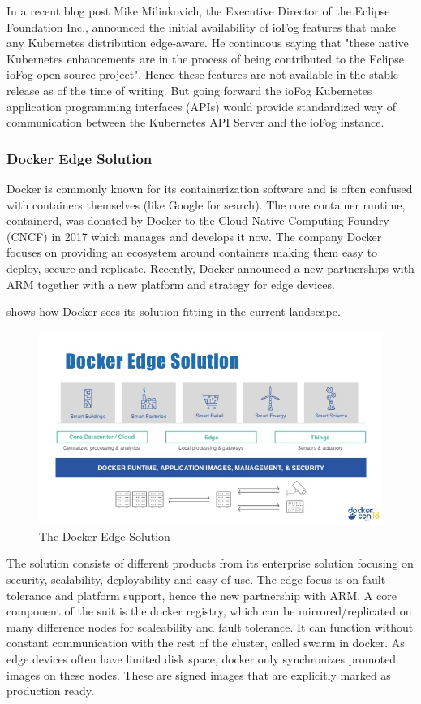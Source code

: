 In a recent blog post Mike Milinkovich, the Executive Director of the Eclipse Foundation Inc., announced the initial availability of ioFog features that make any Kubernetes distribution edge-aware. He continuous saying that "these native Kubernetes enhancements are in the process of being contributed to the Eclipse ioFog open source project". Hence these features are not available in the stable release as of the time of writing. But going forward the ioFog Kubernetes application programming interfaces (APIs) would provide standardized way of communication between the Kubernetes API Server and the ioFog instance.

\subsubsection{Docker Edge Solution}
Docker is commonly known for its containerization software and is often confused with containers themselves (like Google for search). The core container runtime, containerd, was donated by Docker to the Cloud Native Computing Foundry (CNCF) in 2017\cite{containerDonationDocker79:online} which manages and develops it now. The company Docker focuses on providing an ecosystem around containers making them easy to deploy, secure and replicate. Recently, Docker announced a new partnerships with ARM together with a new platform and strategy for edge devices.

 shows how Docker sees its solution fitting in the current landscape.
\begin{figure}[!ht]
    \centering
    \includegraphics[scale=0.65]{figures/docker-edge-solution.jpg}
    \caption{The Docker Edge Solution}
    \label{fig:dockerEdge}
\end{figure}
The solution consists of different products from its enterprise solution focusing on security, scalability, deployability and easy of use. The edge focus is on fault tolerance and platform support, hence the new partnership with ARM. A core component of the suit is the docker registry, which can be mirrored/replicated on many difference nodes for scaleability and fault tolerance. It can function without constant communication with the rest of the cluster, called swarm in docker. As edge devices often have limited disk space, docker only synchronizes promoted images on these nodes. These are signed images that are explicitly marked as production ready.

